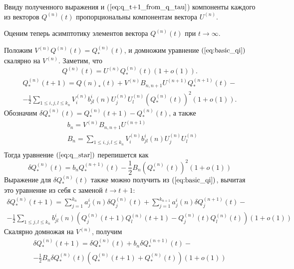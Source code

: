 \documentclass[12pt]{article}
\renewcommand{\leq}{\leqslant}
\begin{document}
{Ввиду полученного выражения и ($\ref{eq:q_t+1_from_q_tau}$) компоненты каждого из векторов $Q^{(n)}(t)$ пропорциональны компонентам вектора $U^{(n)}$.

Оценим теперь асимптотику элементов вектора $Q^{(n)}(t)$ при $t \rightarrow \infty$.

Положим $V^{(n)} Q^{(n)}(t) = Q^{(n)}_*(t)$, и домножим уравнение $(\ref{eq:basic_qi})$ скалярно на $V^{(n)}$. Заметим, что
\begin{equation}
\label{eq:q_uq}
	Q^{(n)}(t) = U^{(n)} Q^{(n)}_*(t) (1 + o(1)).
\end{equation}
\begin{multline}
\label{eq:q_star}
	Q^{(n)}_*(t+1) = Q{(n)}_*(t) + V^{(n)} B_{n,n+1} U^{(n+1)} Q^{(n+1)}_*(t) - \\
	- \frac{1}{2} \sum_{1 \leq i,j,l \leq k_n} V^{(n)}_i b^i_{jl}(n) U^{(n)}_j U^{(n)}_l \left( Q^{(n)}_*(t) \right)^2 (1 + o(1)).
\end{multline}
Обозначим $\delta Q^{(n)}_*(t) = Q^{(n)}_*(t+1) - Q^{(n)}_*(t)$, а также
\begin{equation*}
	\begin{split}
		&b_n = V^{(n)} B_{n,n+1} U^{(n+1)} \\
		&B_n = \sum_{1 \leq i,j,l \leq k_n} V^{(n)}_i b^i_{jl}(n) U^{(n)}_j U^{(n)}_l \\
	\end{split}
\end{equation*}
Тогда уравнение $(\ref{eq:q_star})$ перепишется как
\begin{equation}
\label{eq:delta_q_star_q_star}
	\delta Q^{(n)}_*(t) = b_n Q^{(n+1)}_*(t) - \frac{1}{2} B_n (Q^{(n)}_*(t))^2 (1 + o(1))
\end{equation}
Выражение для $\delta Q^{(n)}_*(t)$ также можно получить из $(\ref{eq:basic_qi})$, вычитая это уравнение из себя с заменой $t \rightarrow t+1$:
\begin{multline*}
	\delta Q^{(n)}_*(t+1) = \sum_{j = 1}^{k_n} a^i_j(n) \delta Q^{(n)}_j(t) + \sum_{j = 1}^{k_{n+1}} a^i_j(n) \delta Q^{(n+1)}_j(t) - \\
	- \frac{1}{2} \sum_{1 \leq j,l \leq k_n} b^i_{jl}(n) \left( Q^{(n)}_j(t+1) Q^{(n)}_l(t+1) - Q^{(n)}_j(t) Q^{(n)}_l(t) \right) (1 + o(1))
\end{multline*}
Скалярно домножая на $V^{(n)}$, получим
\begin{multline}
\label{eq:delta_q_star}
	\delta Q^{(n)}_*(t+1) = \delta Q^{(n)}_*(t) + b_n \delta Q^{(n+1)}_*(t) - \\
	- \frac{1}{2} B_n \delta Q^{(n)}_*(t) \left( Q^{(n)}_*(t+1) + Q^{(n)}_*(t) \right) (1 + o(1))
\end{multline}

}
\end{document}
